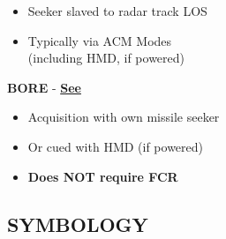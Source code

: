 \documentclass[fontInter]{TechCheck}
\begin{document}
\begin{tableitemize}
{\begin{subitemize}
			\begin{itemize}
				\item Seeker slaved to radar track LOS \\
				\item Typically via ACM Modes \\
				(including HMD, if powered)
			\end{itemize}
			\item \textbf{BORE} - \hyperref[subsec:aim9bore]{\textbf{See }}
			\begin{itemize}
				\item Acquisition with own missile seeker
				\item Or cued with HMD (if powered)
				\item \textbf{Does NOT require FCR}
			\end{itemize}
		\end{subitemize}}
	\end{tableitemize}


	\clearpage

	\subsection{SYMBOLOGY}
	\begin{tableitemize}
	\end{tableitemize}

	\clearpage
\end{document}
